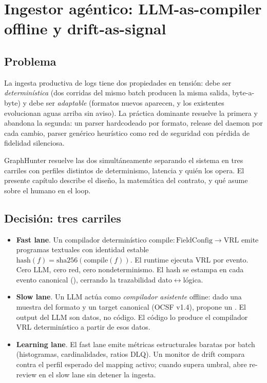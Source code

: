 \chapter{Ingestor agéntico: LLM-as-compiler offline y drift-as-signal}
\label{sec:paper-ingestor}

\section{Problema}

La ingesta productiva de logs tiene dos propiedades en tensión:
debe ser \emph{determinística} (dos corridas del mismo batch
producen la misma salida, byte-a-byte) y debe ser \emph{adaptable}
(formatos nuevos aparecen, y los existentes evolucionan aguas
arriba sin aviso). La práctica dominante resuelve la primera y
abandona la segunda: un parser hardcodeado por formato, release del
daemon por cada cambio, parser genérico heurístico como red de
seguridad con pérdida de fidelidad silenciosa.

GraphHunter resuelve las dos simultáneamente separando el sistema
en tres carriles con perfiles distintos de determinismo, latencia y
quién los opera. El presente capítulo describe el diseño, la
matemática del contrato, y qué asume sobre el humano en el loop.

\section{Decisión: tres carriles}

\begin{itemize}
    \item \textbf{Fast lane}. Un compilador determinístico
    $\text{compile}: \text{FieldConfig} \to \text{VRL}$ emite
    programas textuales con identidad estable
    $\text{hash}(f) = \text{sha256}(\text{compile}(f))$. El runtime
    ejecuta VRL por evento. Cero LLM, cero red, cero
    nondeterminismo. El hash se estampa en cada evento canonical
    (), cerrando la trazabilidad
    dato$\leftrightarrow$lógica.
    \item \textbf{Slow lane}. Un LLM actúa como \emph{compilador
    asistente} offline: dado una muestra del formato y un target
    canonical (OCSF v1.4), propone un . El output
    del LLM son datos, no código. El código lo produce el compilador
    VRL determinístico a partir de esos datos.
    \item \textbf{Learning lane}. El fast lane emite métricas
    estructurales baratas por batch (histogramas, cardinalidades,
    ratios DLQ). Un monitor de drift compara contra el perfil
    esperado del mapping activo; cuando supera umbral, abre
    re-review en el slow lane sin detener la ingesta.
\end{itemize}

